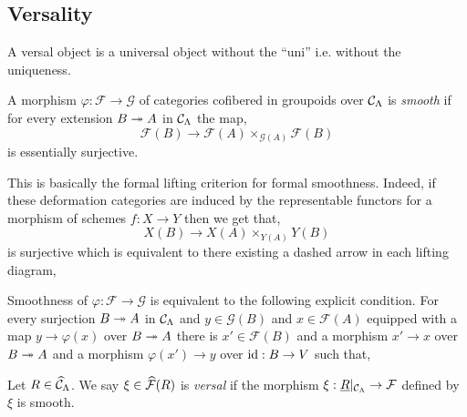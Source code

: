 \documentclass[12pt]{article}
\renewcommand{\F}{\mathcal{F}}
\renewcommand{\G}{\mathcal{G}}
\begin{document}
\subsection{Versality}

\begin{rmk}
A versal object is a universal object without the ``uni'' i.e. without the uniqueness. 
\end{rmk}

\begin{defn}
A morphism $\varphi : \F \to \G$ of categories cofibered in groupoids over $\mathcal{C}_\Lambda$ is \textit{smooth} if for every extension $B \twoheadrightarrow A$ in $\mathcal{C}_{\Lambda}$ the map,
\[ \F(B) \to \F(A) \times_{\G(A)} \F(B) \]
is essentially surjective.
\end{defn}

\begin{rmk}
This is basically the formal lifting criterion for formal smoothness. Indeed, if these deformation categories are induced by the representable functors for a morphism of schemes $f : X \to Y$ then we get that,
\[ X(B) \to X(A) \times_{Y(A)} Y(B) \]
is surjective which is equivalent to there existing a dashed arrow in each lifting diagram,
\begin{center}
\end{center} 
\end{rmk}

\begin{lemma}
Smoothness of $\varphi : \F \to \G$ is equivalent to the following explicit condition. For every surjection $B \twoheadrightarrow A$ in $\mathcal{C}_{\Lambda}$ and $y \in \G(B)$ and $x \in \F(A)$ equipped with a map $y \to \varphi(x)$ over $B \twoheadrightarrow A$ there is $x' \in \F(B)$ and a morphism $x' \to x$ over $B \twoheadrightarrow A$ and a morphism $\varphi(x') \to y$ over $\mathrm{id} : B \to V$ such that,
\begin{center}
\end{center}
\end{lemma}

\begin{defn}
Let $R \in \widehat{\mathcal{C}}_{\Lambda}$. We say $\xi \in \wh{\F}(R)$ is \textit{versal} if the morphism $\xi : \underline{R}|_{\C_\Lambda} \to \F$ defined by $\xi$ is smooth.
\end{defn}
\end{document}
